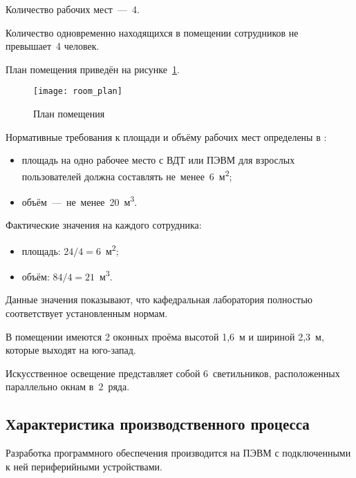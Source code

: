 Количество рабочих мест~---~4.

Количество одновременно находящихся в помещении сотрудников не превышает~4 человек.

План помещения приведён на рисунке~\ref{fig:labourprotection:room_plan}.

\begin{figure}[h]
\texttt{[image: room\_plan]}
\caption{План помещения}\label{fig:labourprotection:room_plan}
\end{figure}

Нормативные требования к площади и объёму рабочих мест определены в \cite{SanPin2_2_2}:
\begin{itemize}
	\item площадь на одно рабочее место с ВДТ или ПЭВМ для взрослых пользователей должна составлять не~менее~6~м\textsuperscript{2};
	\item объём~---~не~менее~20~м\textsuperscript{3}.
\end{itemize}

Фактические значения на каждого сотрудника:
\begin{itemize}
	\item площадь: $24/4 = 6$~м\textsuperscript{2};
	\item объём: $84/4 = 21$~м\textsuperscript{3}.
\end{itemize}

Данные значения показывают, что кафедральная лаборатория полностью соответствует установленным нормам.

В помещении имеются 2 оконных проёма высотой 1,6~м и шириной 2,3~м, которые выходят на юго-запад.

Искусственное освещение представляет собой 6~светильников, расположенных параллельно окнам в~2~ряда.

\subsection{Характеристика производственного процесса}
Разработка программного обеспечения производится на ПЭВМ с подключенными к ней периферийными устройствами.

